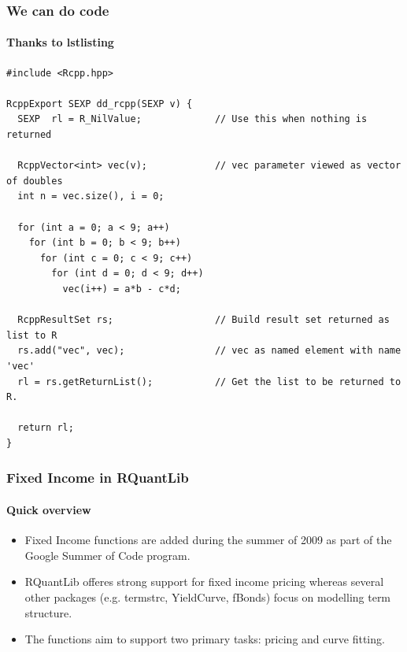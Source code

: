 \documentclass[smaller,compress, 9pt]{beamer}
\begin{document}
\begin{frame}[fragile]  %
  \frametitle{We can do code}
  \framesubtitle{Thanks to lstlisting}

\lstset{language=C++,basicstyle=\tiny}
\begin{lstlisting}
#include <Rcpp.hpp>

RcppExport SEXP dd_rcpp(SEXP v) {
  SEXP  rl = R_NilValue;             // Use this when nothing is returned

  RcppVector<int> vec(v);            // vec parameter viewed as vector of doubles
  int n = vec.size(), i = 0;

  for (int a = 0; a < 9; a++)
    for (int b = 0; b < 9; b++)
      for (int c = 0; c < 9; c++)
        for (int d = 0; d < 9; d++)
          vec(i++) = a*b - c*d;

  RcppResultSet rs;                  // Build result set returned as list to R
  rs.add("vec", vec);                // vec as named element with name 'vec'
  rl = rs.getReturnList();           // Get the list to be returned to R.

  return rl;
}
\end{lstlisting}


\end{frame}

\begin{frame}
	\frametitle{Fixed Income in RQuantLib}
	\framesubtitle{Quick overview}
	\begin{itemize}
		\item Fixed Income functions are added during the summer of 2009 as part of the Google Summer of 	Code program. 
		\item  RQuantLib offeres strong support for fixed income pricing whereas several other packages (e.g. termstrc, YieldCurve, fBonds) focus on modelling term structure.		
		\item The functions aim to support two primary tasks: pricing and curve fitting. 		
	\end{itemize}
\end{frame}
\end{document}
